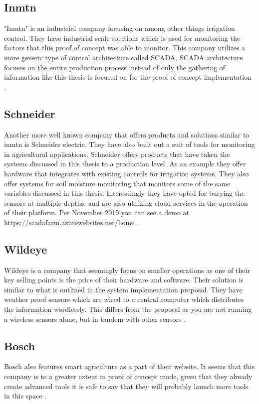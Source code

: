 \documentclass[]{uiophd}
\begin{document}
\subsection{Inmtn}
"Inmtn" is an industrial company focusing on among other things irrigation control. They have industrial scale solutions which is used for monitoring the factors that this proof of concept was able to monitor. This company utilizes a more generic type of control architecture called SCADA.  SCADA architecture focuses on the entire production process instead of only the gathering of information like this thesis is focused on for the proof of concept implementation \cite{inmtn}.

\subsection{Schneider}
Another more well known company that offers products and solutions similar to inmtn is Schneider electric. They have also built out a suit of tools for monitoring in agricultural applications. Schneider offers products that have taken the systems discussed in this thesis to a production level. As an example they offer hardware that integrates with existing controls for irrigation systems. They also offer systems for soil moisture monitoring that monitors some of the same variables discussed in this thesis. Interestingly they have opted for burying the sensors at multiple depths, and are also utilizing cloud services in the operation of their platform. Per November 2019 you can see a demo at https://scadafarm.azurewebsites.net/home \cite{Schneider}. 

\subsection{Wildeye}
Wildeye is a company that seemingly focus on smaller operations as one of their key selling points is the price of their hardware and software. Their solution is similar to what is outlined in the system implementation proposal. They have weather proof sensors which are wired to a central computer which distributes the information wordlessly. This differs from the proposal as you are not running a wireless sensors alone, but in tandem with other sensors \cite{wildeye}.

\subsection{Bosch}
Bosch also features smart agriculture as a part of their website. It seems that this company is to a greater extent in proof of concept mode, given that they already create advanced tools it is safe to say that they will probably launch more tools in this space \cite{Bosch}.
\end{document}
